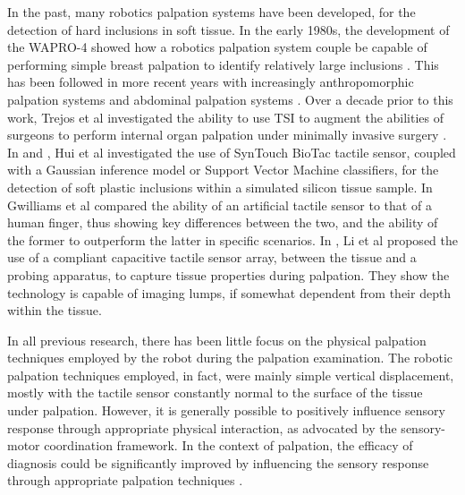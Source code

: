 \color{red}
In the past, many robotics palpation systems have been developed, for the detection of hard inclusions in soft tissue. In the early 1980s, the development of the WAPRO-4 showed how a robotics palpation system couple be capable of performing simple breast palpation to identify relatively large inclusions \cite{kato1988automatic}.  This has been followed in more recent years with increasingly anthropomorphic palpation systems \cite{dario1988advanced} and abdominal palpation systems \cite{davaria2014design}. Over a decade prior to this work, Trejos et al investigated the ability to use TSI to augment the abilities of surgeons to perform internal organ palpation under minimally invasive surgery \cite{trejos2009robot}. In \cite{hui2016robust} and \cite{hui2014evaluating}, Hui et al investigated the use of SynTouch BioTac tactile sensor, coupled with a Gaussian inference model or Support Vector Machine classifiers, for the detection of soft plastic inclusions within a simulated silicon tissue sample. In \cite{gwilliam2010human} Gwilliams et al compared the ability of an artificial tactile sensor to that of a human finger, thus showing key differences between the two, and the ability of the former to outperform the latter in specific scenarios. In \cite{li2017mechanical}, Li et al proposed the use of a compliant capacitive tactile sensor array, between the tissue and a probing apparatus, to capture tissue properties during palpation. They show the technology is capable of imaging lumps, if somewhat dependent from their depth within the tissue. 

In all previous research, there has been little focus on the physical palpation techniques employed by the robot during the palpation examination. The robotic palpation techniques employed, in fact, were mainly simple vertical displacement, mostly with the tactile sensor constantly normal to the surface of the tissue under palpation. However, it is generally possible to positively influence sensory response through appropriate physical interaction, as advocated by the sensory-motor coordination framework. In the context of palpation, the efficacy of diagnosis could be significantly improved by influencing the sensory response through appropriate palpation techniques \cite{lungarella2003developmental, scimecasoft}.


